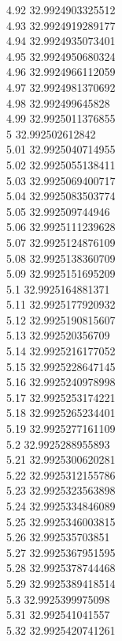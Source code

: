 {4.92	32.9924903325512\\
4.93	32.9924919289177\\
4.94	32.9924935073401\\
4.95	32.9924950680324\\
4.96	32.9924966112059\\
4.97	32.9924981370692\\
4.98	32.992499645828\\
4.99	32.9925011376855\\
5	32.992502612842\\
5.01	32.9925040714955\\
5.02	32.9925055138411\\
5.03	32.9925069400717\\
5.04	32.9925083503774\\
5.05	32.992509744946\\
5.06	32.9925111239628\\
5.07	32.9925124876109\\
5.08	32.9925138360709\\
5.09	32.9925151695209\\
5.1	32.9925164881371\\
5.11	32.9925177920932\\
5.12	32.9925190815607\\
5.13	32.992520356709\\
5.14	32.9925216177052\\
5.15	32.9925228647145\\
5.16	32.9925240978998\\
5.17	32.9925253174221\\
5.18	32.9925265234401\\
5.19	32.9925277161109\\
5.2	32.9925288955893\\
5.21	32.9925300620281\\
5.22	32.9925312155786\\
5.23	32.9925323563898\\
5.24	32.9925334846089\\
5.25	32.9925346003815\\
5.26	32.992535703851\\
5.27	32.9925367951595\\
5.28	32.9925378744468\\
5.29	32.9925389418514\\
5.3	32.9925399975098\\
5.31	32.992541041557\\
5.32	32.9925420741261\\
}
